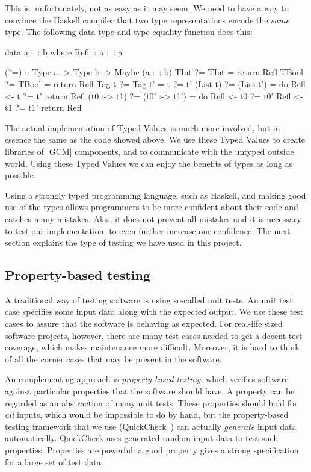 \documentclass{article}
\begin{document}
This is, unfortunately, not as easy as it may seem.
%
We need to have a way to convince the Haskell compiler that two type
representations encode the \emph{same} type.
%
The following data type and type equality function does this:
%
\begin{haskellcode}
data a :~: b where
  Refl :: a :~: a

(?=) :: Type a -> Type b -> Maybe (a :~: b)
TInt         ?= TInt       = return Refl
TBool        ?= TBool      = return Refl
Tag t        ?= Tag t'     = t ?= t'
(List t)     ?= (List t')  = do
  Refl <- t  ?= t'
  return Refl
(t0 :-> t1)  ?= (t0' :-> t1') = do
  Refl <- t0 ?= t0'
  Refl <- t1 ?= t1'
  return Refl
\end{haskellcode}
%
The actual implementation of Typed Values is much more involved, but
in essence the same as the code showed above.
%
We use these Typed Values to create libraries of |GCM| components, and
to communicate with the untyped outside world.
%
Using these Typed Values we can enjoy the benefits of types as long as
possible.

Using a strongly typed programming language, such as Haskell, and
making good use of the types allows programmers to be more confident
about their code and catches many mistakes.
%
Alas, it does not prevent all mistakes and it is necessary to test our
implementation, to even further increase our confidence.
%
The next section explains the type of testing we have used in this
project.

\subsection{Property-based testing}

A traditional way of testing software is using so-called unit tests.
%
An unit test case specifies some input data along with the expected
output.
%
We use these test cases to assure that the software is behaving as
expected.
%
For real-life sized software projects, however, there are many test
cases needed to get a decent test coverage, which makes maintenance
more difficult.
%
Moreover, it is hard to think of all the corner cases that may be
present in the software.

An complementing approach is \emph{property-based testing}, which
verifies software against particular properties that the software
should have.
%
A property can be regarded as an abstraction of many unit tests.
%
These properties should hold for \emph{all} inputs, which would be
impossible to do by hand, but the property-based testing framework
that we use (QuickCheck~\cite{QuickCheck}) can actually
\emph{generate} input data automatically.
%
QuickCheck uses generated random input data to test such properties.
%
Properties are powerful: a good property gives a strong specification
for a large set of test data.
\end{document}
